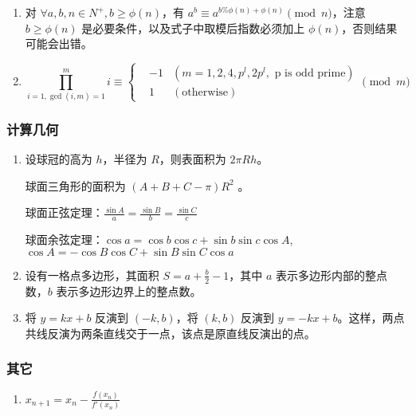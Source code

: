 \begin{enumerate}

\item 对 $\forall a, b, n \in N^{+}, b \ge \phi(n)$，有 $a ^ {b} \equiv a ^ {b \% \phi(n) + \phi(n)}\pmod{n}$，注意 $b \ge \phi(n)$ 是必要条件，以及式子中取模后指数必须加上 $\phi(n)$，否则结果可能会出错。

\item

\begin{equation}
\prod_{i=1,\gcd(i,m)=1}^{m}i\equiv\begin{cases}
&-1&(m=1,2,4,p^{l},2p^{l},\text{ p is odd prime})\\
&1&(\text{otherwise})
\end{cases}\pmod{m}
\end{equation}

\end{enumerate}

\subsubsection{计算几何}

\begin{enumerate}

\item 设球冠的高为 $h$，半径为 $R$，则表面积为 $2\pi Rh$。

球面三角形的面积为 $(A+B+C-\pi)R^{2}$ 。

球面正弦定理：$\frac{\sin A}{a} = \frac{\sin B}{b} = \frac{\sin C}{c}$

球面余弦定理：$\cos a=\cos b\cos c+\sin b\sin c\cos A$, $\cos A=-\cos B\cos C+\sin B\sin C\cos a$

\item 设有一格点多边形，其面积 $S=a+\frac{b}{2}-1$，其中 $a$ 表示多边形内部的整点数，$b$ 表示多边形边界上的整点数。

\item 将 $y=kx+b$ 反演到 $(-k,b)$，将 $(k,b)$ 反演到 $y=-kx+b$。这样，两点共线反演为两条直线交于一点，该点是原直线反演出的点。

\end{enumerate}

\subsubsection{其它}

\begin{enumerate}

\item $x_{n+1}=x_{n}-\frac{f(x_{n})}{f'(x_{n})}$

\end{enumerate}